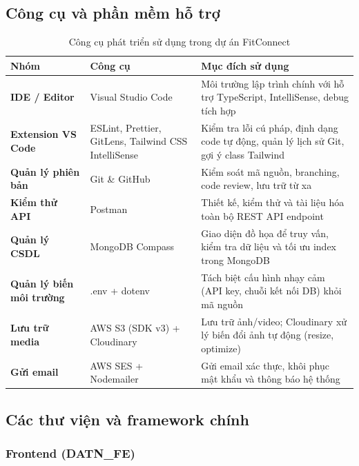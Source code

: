 \subsection{Công cụ và phần mềm hỗ trợ}
\label{subsec:impl_tools}

\begin{table}[H]
\centering
\caption{Công cụ phát triển sử dụng trong dự án FitConnect}
\label{tab:impl_tools}
\begin{tabular}{|p{3.5cm}|p{3.5cm}|p{7cm}|}
\hline
\textbf{Nhóm} & \textbf{Công cụ} & \textbf{Mục đích sử dụng} \\
\hline
\textbf{IDE / Editor} & Visual Studio Code & Môi trường lập trình chính với hỗ trợ TypeScript, IntelliSense, debug tích hợp \\
\hline
\textbf{Extension VS Code} & ESLint, Prettier, GitLens, Tailwind CSS IntelliSense & Kiểm tra lỗi cú pháp, định dạng code tự động, quản lý lịch sử Git, gợi ý class Tailwind \\
\hline
\textbf{Quản lý phiên bản} & Git \& GitHub & Kiểm soát mã nguồn, branching, code review, lưu trữ từ xa \\
\hline
\textbf{Kiểm thử API} & Postman & Thiết kế, kiểm thử và tài liệu hóa toàn bộ REST API endpoint \\
\hline
\textbf{Quản lý CSDL} & MongoDB Compass & Giao diện đồ họa để truy vấn, kiểm tra dữ liệu và tối ưu index trong MongoDB \\
\hline
\textbf{Quản lý biến môi trường} & .env + dotenv & Tách biệt cấu hình nhạy cảm (API key, chuỗi kết nối DB) khỏi mã nguồn \\
\hline
\textbf{Lưu trữ media} & AWS S3 (SDK v3) + Cloudinary & Lưu trữ ảnh/video; Cloudinary xử lý biến đổi ảnh tự động (resize, optimize) \\
\hline
\textbf{Gửi email} & AWS SES + Nodemailer & Gửi email xác thực, khôi phục mật khẩu và thông báo hệ thống \\
\hline
\end{tabular}
\end{table}

\subsection{Các thư viện và framework chính}
\label{subsec:impl_libraries}

\subsubsection{Frontend (DATN\_FE)}
\label{subsubsec:impl_fe_libs}


